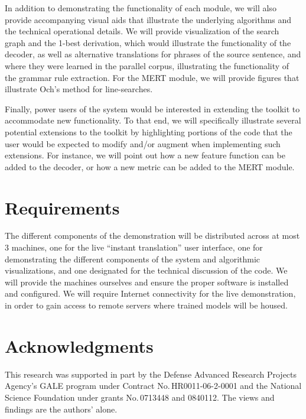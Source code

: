 \documentclass[11pt]{article}
\begin{document}
In addition to demonstrating the functionality of each module, we will also provide accompanying visual aids that illustrate the underlying algorithms and the technical operational details. We will provide visualization of the search graph and the 1-best derivation, which would illustrate the functionality of the decoder, as well as alternative translations for phrases of the source sentence, and where they were learned in the parallel corpus, illustrating the functionality of the grammar rule extraction. For the MERT module, we will provide figures that illustrate Och's method for line-searches.

Finally, power users of the system would be interested in extending the toolkit to accommodate new functionality. To that end, we will specifically illustrate several potential extensions to the toolkit by highlighting portions of the code that the user would be expected to modify and/or augment when implementing such extensions. For instance, we will point out how a new feature function can be added to the decoder, or how a new metric can be added to the MERT module.

\section{Requirements}

The different components of the demonstration will be distributed across at most 3 machines, one for the live ``instant translation'' user interface, one for demonstrating the different components of the system and algorithmic visualizations, and one designated for the technical discussion of the code. We will provide the machines ourselves and ensure the proper software is installed and configured. We will require Internet connectivity for the live demonstration, in order to gain access to remote servers where trained models will be housed.



\section*{Acknowledgments}
This research was supported in part by the Defense Advanced Research Projects Agency's GALE program under Contract No.\,HR0011-06-2-0001 and the National Science Foundation under grants No.\,0713448 and 0840112. The views and findings are the authors' alone.




\end{document}
